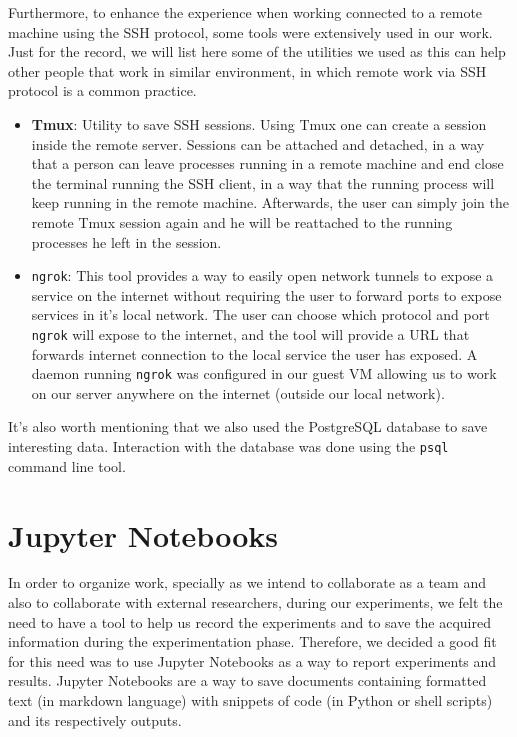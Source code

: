 Furthermore, to enhance the experience when working connected to a remote machine using the SSH protocol, some tools were extensively used in our work. Just for the record, we will list here some of the utilities we used as this can help other people that work in similar environment, in which remote work via SSH protocol is a common practice.

\begin{itemize}
    \item \textbf{Tmux}: Utility to save SSH sessions. Using Tmux one can create a session inside the remote server. Sessions can be attached and detached, in a way that a person can leave processes running in a remote machine and end close the terminal running the SSH client, in a way that the running process will keep running in the remote machine. Afterwards, the user can simply join the remote Tmux session again and he will be reattached to the running processes he left in the session.
    
    \item {\tt ngrok}: This tool provides a way to easily open network tunnels to expose a service on the internet without requiring the user to forward ports to expose services in it's local network. The user can choose which protocol and port {\tt ngrok} will expose to the internet, and the tool will provide a URL that forwards internet connection to the local service the user has exposed. A daemon running {\tt ngrok} was configured in our guest VM allowing us to work on our server anywhere on the internet (outside our local network).
\end{itemize}

It's also worth mentioning that we also used the PostgreSQL database to save interesting data. Interaction with the database was done using the {\tt psql} command line tool.

\section{Jupyter Notebooks}

In order to organize work, specially as we intend to collaborate as a team and also to collaborate with external researchers, during our experiments, we felt the need to have a tool to help us record the experiments and to save the acquired information during the experimentation phase. Therefore, we decided a good fit for this need was to use Jupyter Notebooks as a way to report experiments and results. Jupyter Notebooks are a way to save documents containing formatted text (in markdown language) with snippets of code (in Python or shell scripts) and its respectively outputs.

